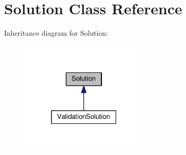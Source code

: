 \hypertarget{class_solution}{}\section{Solution Class Reference}
\label{class_solution}


Inheritance diagram for Solution\+:\nopagebreak
\begin{figure}[H]
\begin{center}
\leavevmode
\includegraphics[width=175pt]{class_solution__inherit__graph}
\end{center}
\end{figure}
